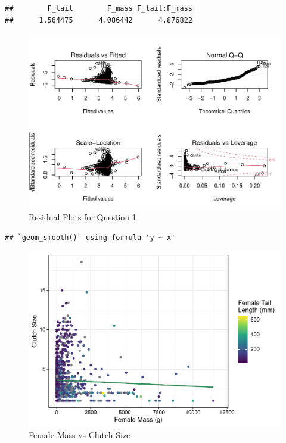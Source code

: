 \documentclass[
  12pt,
]{article}
\begin{document}
\begin{verbatim}
##        F_tail        F_mass F_tail:F_mass 
##      1.564475      4.086442      4.876822
\end{verbatim}

\begin{figure}
\centering
\includegraphics{Project_Code_files/figure-latex/q -1 residuals-1.pdf}
\caption{Residual Plots for Question 1}
\end{figure}

\begin{verbatim}
## `geom_smooth()` using formula 'y ~ x'
\end{verbatim}

\begin{figure}
\centering
\includegraphics{Project_Code_files/figure-latex/q-1 plots-1.pdf}
\caption{Female Mass vs Clutch Size}
\end{figure}
\end{document}

